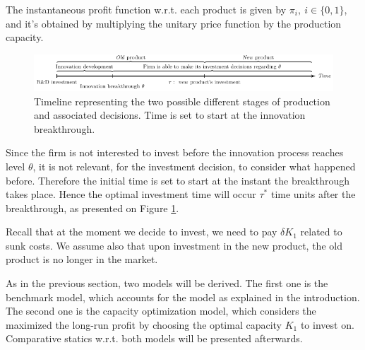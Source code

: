 The instantaneous profit function w.r.t. each product is given by $\pi_i, \ i \in \{0,1\}$, and it's obtained by multiplying the unitary price function by the production capacity. %


\begin{figure}[!htb]
	\centering
	\includegraphics[width=\textwidth]{Prob2_CapOpt/2_timelinet.PNG}
	\caption{Timeline representing the two possible different stages of production and associated decisions. Time is set to start at the innovation breakthrough.}
	\label{2_time}
\end{figure}

Since the firm is not interested to invest before the innovation process reaches level $\theta$, it is not relevant, for the investment decision, to consider what happened before. Therefore the initial time is set to start at the instant the breakthrough takes place. %
Hence the optimal investment time will occur $\tau^*$ time units after the breakthrough, as presented on Figure \ref{2_time}.

Recall that at the moment we decide to invest, we need to pay $\delta K_1$ related to sunk costs. We assume also that upon investment in the new product, the old product is no longer in the market.



As in the previous section, two models will be derived. The first one is the benchmark model, which accounts for the model as explained in the introduction. The second one is the capacity optimization model, which considers the maximized the long-run profit by choosing the optimal capacity $K_1$ to invest on. Comparative statics w.r.t. both models will be presented afterwards.




